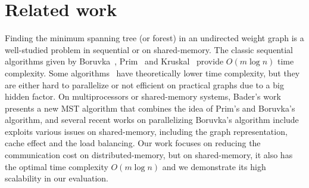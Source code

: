 \documentclass{sokendai_thesis} %
\newcommand{\boruvka}[0]{Boruvka}
\begin{document}





\section{Related work}

Finding the minimum spanning tree (or forest) in an undirected weight graph is a well-studied problem in sequential or on shared-memory.
The classic sequential algorithms given by \boruvka{}~\cite{boruvka}, Prim~\cite{prim} and Kruskal~\cite{kruskal} provide $O(m\log n)$ time complexity.
Some algorithms~\cite{yao1975,cheriton1976finding,osipov2009filter,chazelle2000minimum,gabow1986efficient,pettie1999finding} have theoretically lower time complexity, but they are either hard to parallelize or not efficient on practical graphs due to a big hidden factor.
On multiprocessors or shared-memory systems,
Bader's work~\cite{bader2006fast} presents a new MST algorithm that combines the idea of Prim's and \boruvka{}'s algorithm, and several recent works on parallelizing \boruvka{}'s algorithm include~\cite{pingali2011tao,da2015generic,zhou2017practical} exploits various issues on shared-memory, including the graph representation, cache effect and the load balancing.
Our work focuses on reducing the communication cost on distributed-memory, but on shared-memory, it also has the optimal time complexity $O(m\log n)$ and we demonstrate its high scalability in our evaluation.
\end{document}
